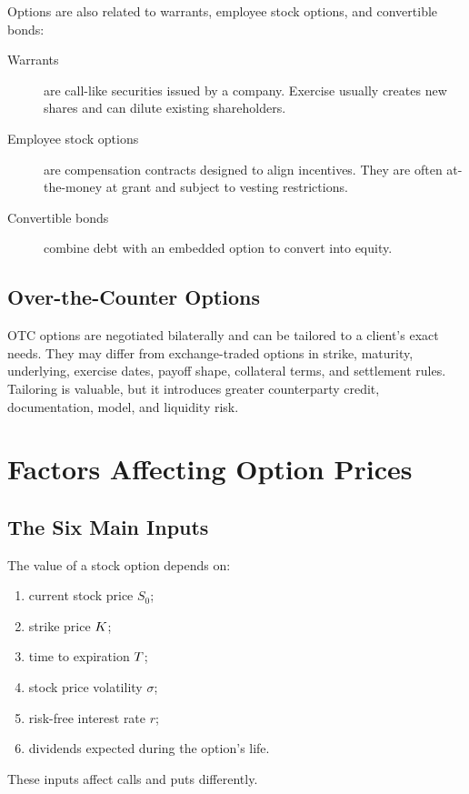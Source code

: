 Options are also related to warrants, employee stock options, and convertible
bonds:
\begin{description}
    \item[Warrants] are call-like securities issued by a company. Exercise
    usually creates new shares and can dilute existing shareholders.
    \item[Employee stock options] are compensation contracts designed to align
    incentives. They are often at-the-money at grant and subject to vesting
    restrictions.
    \item[Convertible bonds] combine debt with an embedded option to convert
    into equity.
\end{description}

\subsection{Over-the-Counter Options}

OTC options are negotiated bilaterally and can be tailored to a client's exact
needs. They may differ from exchange-traded options in strike, maturity,
underlying, exercise dates, payoff shape, collateral terms, and settlement
rules. Tailoring is valuable, but it introduces greater counterparty credit,
documentation, model, and liquidity risk.

\section{Factors Affecting Option Prices}

\subsection{The Six Main Inputs}

The value of a stock option depends on:
\begin{enumerate}
    \item current stock price $S_0$;
    \item strike price $K$;
    \item time to expiration $T$;
    \item stock price volatility $\sigma$;
    \item risk-free interest rate $r$;
    \item dividends expected during the option's life.
\end{enumerate}

These inputs affect calls and puts differently.


